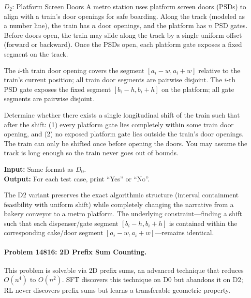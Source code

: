 \documentclass[]{bytedance_seed}
\theoremstyle{plain}
\theoremstyle{definition}
\theoremstyle{remark}
\begin{document}
\begin{problembox}{$D_2$: Platform Screen Doors}
A metro station uses platform screen doors (PSDs) to align with a train's door openings for safe boarding. Along the track (modeled as a number line), the train has $n$ door openings, and the platform has $n$ PSD gates. Before doors open, the train may slide along the track by a single uniform offset (forward or backward). Once the PSDs open, each platform gate exposes a fixed segment on the track.

The $i$-th train door opening covers the segment $[a_i - w, a_i + w]$ relative to the train's current position; all train door segments are pairwise disjoint. The $i$-th PSD gate exposes the fixed segment $[b_i - h, b_i + h]$ on the platform; all gate segments are pairwise disjoint.

Determine whether there exists a single longitudinal shift of the train such that after the shift: (1) every platform gate lies completely within some train door opening, and (2) no exposed platform gate lies outside the train's door openings. The train can only be shifted once before opening the doors. You may assume the track is long enough so the train never goes out of bounds.

\vspace{1.5mm}
\noindent\textbf{Input:} Same format as $D_0$.\\
\textbf{Output:} For each test case, print ``Yes'' or ``No''.
\end{problembox}

\noindent The D2 variant preserves the exact algorithmic structure (interval containment feasibility with uniform shift) while completely changing the narrative from a bakery conveyor to a metro platform. The underlying constraint---finding a shift such that each dispenser/gate segment $[b_i - h, b_i + h]$ is contained within the corresponding cake/door segment $[a_i - w, a_i + w]$---remains identical.

\paragraph{Problem 14816: 2D Prefix Sum Counting.}

This problem is solvable via 2D prefix sums, an advanced technique that reduces $O(n^4)$ to $O(n^2)$. SFT discovers this technique on D0 but abandons it on D2; RL never discovers prefix sums but learns a transferable geometric property.
\end{document}
